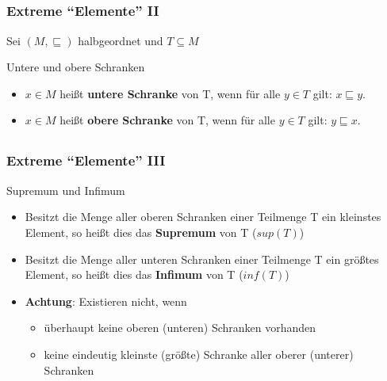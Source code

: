 \subsection*{}
\begin{frame}
  \frametitle{Extreme "`Elemente"' II}
  Sei $( M, \sqsubseteq )$ halbgeordnet und $T \subseteq M$ \pause
  \begin{block}{Untere und obere Schranken}
    \begin{itemize}
    \item $x \in M$ heißt \textbf{untere Schranke} von T, wenn für alle $y \in T$ gilt: $x \sqsubseteq y$. \pause
    \item $x \in M$ heißt \textbf{obere Schranke} von T, wenn für alle $y \in T$ gilt: $y \sqsubseteq x$.  \pause
    \end{itemize}
	\end{block}
\end{frame}

\subsection*{}
\begin{frame}
  \frametitle{Extreme "`Elemente"' III}
	\begin{block}{Supremum und Infimum}
    \begin{itemize}
    \item Besitzt die Menge aller oberen Schranken einer Teilmenge T ein kleinstes Element, so heißt dies das \textbf{Supremum} von T ($sup(T)$) \pause
    \item Besitzt die Menge aller unteren Schranken einer Teilmenge T ein größtes Element, so heißt dies das \textbf{Infimum} von T ($inf(T)$) \pause
    \item \textbf{Achtung}: Existieren nicht, wenn
			\begin{itemize}
				\item überhaupt keine oberen (unteren) Schranken vorhanden \pause
				\item keine eindeutig kleinste (größte) Schranke aller oberer (unterer) Schranken
			\end{itemize}
		\end{itemize}
  \end{block}
\end{frame}

